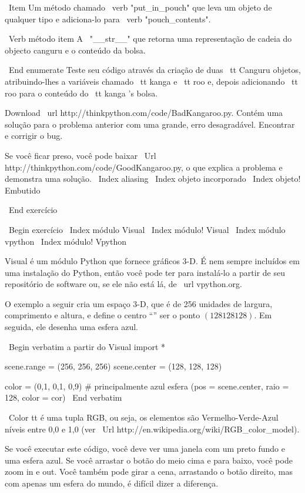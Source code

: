 \documentclass[10pt]{book}
\begin{document}
\begin {itemize}
{{{{{{{{{{{{{{\ Item Um método chamado \ verb "put_in_pouch" que leva um objeto
de qualquer tipo e adiciona-lo para \ verb "pouch_contents".

\ Verb método item A \ "__str__" que retorna uma representação de cadeia
do objecto canguru e o conteúdo da bolsa.

\ End {enumerate}
%
Teste seu código 
através da criação de duas {\ tt Canguru} objetos, atribuindo-lhes a variáveis
chamado {\ tt kanga} e {\ tt roo} e, depois adicionando {\ tt roo} para o
conteúdo do {\ tt kanga} 's bolsa.

Download \ url {http://thinkpython.com/code/BadKangaroo.py}. Contém
uma solução para o problema anterior com uma grande, erro desagradável.
Encontrar e corrigir o bug.

Se você ficar preso, você pode baixar
\ Url {http://thinkpython.com/code/GoodKangaroo.py}, o que explica a
problema e demonstra uma solução.
\ Index {aliasing}
\ Index {objeto incorporado}
\ Index {objeto! Embutido}

\ End {} exercício




\ Begin {} exercício
\ Index {módulo Visual}
\ Index {módulo! Visual}
\ Index {módulo vpython}
\ Index {módulo! Vpython}

Visual é um módulo Python que fornece gráficos 3-D. É
nem sempre incluídos em uma instalação do Python, então você pode ter
para instalá-lo a partir de seu repositório de software ou, se ele não está lá,
de \ url {vpython.org}.

O exemplo a seguir cria um espaço 3-D, que é de 256 unidades
de largura, comprimento e altura, e define o centro ``'' ser o
ponto $ (128128128) $. Em seguida, ele desenha uma esfera azul.

\ Begin {verbatim}
a partir do Visual import *

scene.range = (256, 256, 256)
scene.center = (128, 128, 128)

color = (0,1, 0,1, 0,9) # principalmente azul
esfera (pos = scene.center, raio = 128, color = cor)
\ End {verbatim}

{\ Color tt} é uma tupla RGB, ou seja, os elementos são Vermelho-Verde-Azul
níveis entre 0,0 e 1,0 (ver
\ Url {http://en.wikipedia.org/wiki/RGB_color_model}).

Se você executar este código, você deve ver uma janela com um preto
fundo e uma esfera azul. Se você arrastar o botão do meio
cima e para baixo, você pode zoom in e out. Você também pode girar
a cena, arrastando o botão direito, mas com apenas um
esfera do mundo, é difícil dizer a diferença.

}}}}}}}}}}}}}}
\end{itemize}
\end{document}
